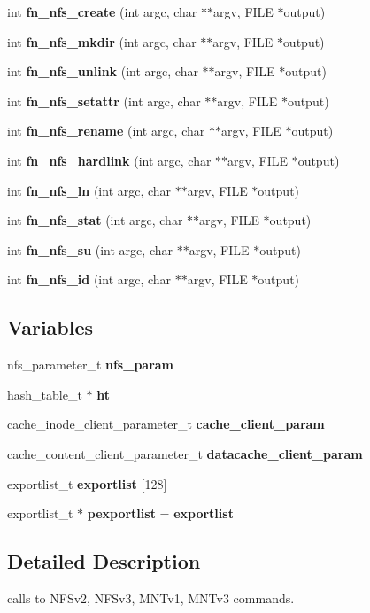 \begin{CompactItemize}
\item 
int {\bf fn\_\-nfs\_\-create} (int argc, char $\ast$$\ast$argv, FILE $\ast$output)
\item 
int {\bf fn\_\-nfs\_\-mkdir} (int argc, char $\ast$$\ast$argv, FILE $\ast$output)
\item 
int {\bf fn\_\-nfs\_\-unlink} (int argc, char $\ast$$\ast$argv, FILE $\ast$output)
\item 
int {\bf fn\_\-nfs\_\-setattr} (int argc, char $\ast$$\ast$argv, FILE $\ast$output)
\item 
int {\bf fn\_\-nfs\_\-rename} (int argc, char $\ast$$\ast$argv, FILE $\ast$output)
\item 
int {\bf fn\_\-nfs\_\-hardlink} (int argc, char $\ast$$\ast$argv, FILE $\ast$output)
\item 
int {\bf fn\_\-nfs\_\-ln} (int argc, char $\ast$$\ast$argv, FILE $\ast$output)
\item 
int {\bf fn\_\-nfs\_\-stat} (int argc, char $\ast$$\ast$argv, FILE $\ast$output)
\item 
int {\bf fn\_\-nfs\_\-su} (int argc, char $\ast$$\ast$argv, FILE $\ast$output)
\item 
int {\bf fn\_\-nfs\_\-id} (int argc, char $\ast$$\ast$argv, FILE $\ast$output)
\end{CompactItemize}
\subsection*{Variables}
\begin{CompactItemize}
\item 
nfs\_\-parameter\_\-t {\bf nfs\_\-param}
\item 
hash\_\-table\_\-t $\ast$ {\bf ht}
\item 
cache\_\-inode\_\-client\_\-parameter\_\-t {\bf cache\_\-client\_\-param}
\item 
cache\_\-content\_\-client\_\-parameter\_\-t {\bf datacache\_\-client\_\-param}
\item 
exportlist\_\-t {\bf exportlist} [128]
\item 
exportlist\_\-t $\ast$ {\bf pexportlist} = {\bf exportlist}
\end{CompactItemize}


\subsection{Detailed Description}
calls to NFSv2, NFSv3, MNTv1, MNTv3 commands. 

